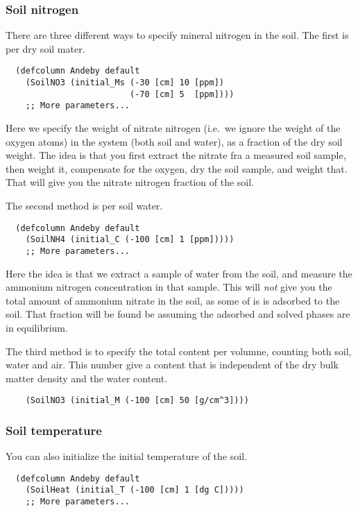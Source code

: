 \documentclass[a4paper,11pt]{article}
\begin{document}
\subsubsection{Soil nitrogen}

There are three different ways to specify mineral nitrogen in the
soil.  The first is per dry soil mater.  
\begin{verbatim}
  (defcolumn Andeby default
    (SoilNO3 (initial_Ms (-30 [cm] 10 [ppm])
                         (-70 [cm] 5  [ppm])))
    ;; More parameters...
\end{verbatim}
Here we specify the weight of nitrate nitrogen (i.e.\ we ignore the
weight of the oxygen atoms) in the system (both soil and water), as a
fraction of the dry soil weight.  The idea is that you first extract
the nitrate fra a measured soil sample, then weight it, compensate for
the oxygen, dry the soil sample, and weight that.  That will give you
the nitrate nitrogen fraction of the soil.  

The second method is per soil water.
\begin{verbatim}
  (defcolumn Andeby default 
    (SoilNH4 (initial_C (-100 [cm] 1 [ppm]))))
    ;; More parameters...
\end{verbatim}
Here the idea is that we extract a sample of water from the soil, and
measure the ammonium nitrogen concentration in that sample.  This will
\emph{not} give you the total amount of ammonium nitrate in the soil,
as some of is is adsorbed to the soil.  That fraction will be found be
assuming the adsorbed and solved phases are in equilibrium.

The third method is to specify the total content per volumne, counting
both soil, water and air. This number give a content that is
independent of the dry bulk matter density and the water content. 
\begin{verbatim}
    (SoilNO3 (initial_M (-100 [cm] 50 [g/cm^3])))
\end{verbatim}

\subsubsection{Soil temperature}

You can also initialize the initial temperature of the soil.
\begin{verbatim}
  (defcolumn Andeby default 
    (SoilHeat (initial_T (-100 [cm] 1 [dg C]))))
    ;; More parameters...
\end{verbatim}
\end{document}
